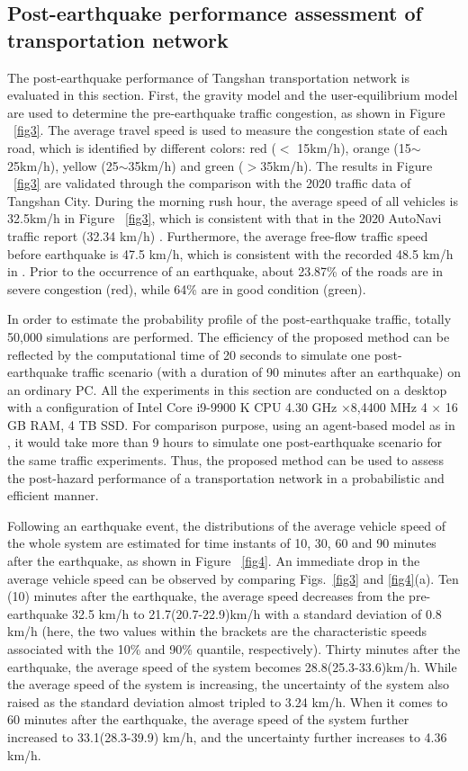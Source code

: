 \documentclass[review,11pt,nonatbib]{elsarticle}
\begin{document}
\subsection{Post-earthquake performance assessment of transportation network}
The post-earthquake performance of Tangshan transportation network is evaluated in this section. First, the gravity model and the user-equilibrium model are used to determine the pre-earthquake traffic congestion, as shown in Figure ~\ref{fig3}. The average travel speed is used to measure the congestion state of each road, which is identified by different colors: red ($<$ 15km/h), orange (15$\sim$25km/h), yellow (25$\sim$35km/h) and green ($>$35km/h). The results in Figure ~\ref{fig3} are validated through the comparison with the 2020 traffic data of Tangshan City. During the morning rush hour, the average speed of all vehicles is 32.5km/h in Figure ~\ref{fig3}, which is consistent with that in the 2020 AutoNavi traffic report (32.34 km/h) \citep{autonavi2020}. Furthermore, the average free-flow traffic speed before earthquake is 47.5 km/h, which is consistent with the recorded 48.5 km/h in \citep{autonavi2020}. Prior to the occurrence of an earthquake, about 23.87\% of the roads are in severe congestion (red), while 64\% are in good condition (green).

\par  In order to estimate the probability profile of the post-earthquake traffic, totally 50,000 simulations are performed. The efficiency of the proposed method can be reflected by the computational time of 20 seconds to simulate one post-earthquake traffic scenario (with a duration of 90 minutes after an earthquake) on an ordinary PC. All the experiments in this section are conducted on a desktop with a configuration of Intel Core i9-9900 K CPU 4.30 GHz ×8,4400 MHz 4 $\times$ 16 GB RAM, 4 TB SSD. For comparison purpose, using an agent-based model as in  \citep{feng2017post}, it would take more than 9 hours to simulate one post-earthquake scenario for the same traffic experiments. Thus, the proposed method can be used to assess the post-hazard performance of a transportation network in a probabilistic and efficient manner. 

\par Following an earthquake event, the distributions of the average vehicle speed of the whole system are estimated for time instants of 10, 30, 60 and 90 minutes after the earthquake, as shown in Figure ~\ref{fig4}. An immediate drop in the average vehicle speed can be observed by comparing Figs.~\ref{fig3} and \ref{fig4}(a). Ten (10) minutes after the earthquake, the average speed decreases from the pre-earthquake 32.5 km/h to 21.7(20.7-22.9)km/h with a standard deviation of 0.8 km/h (here, the two values within the brackets are the characteristic speeds associated with the 10\% and 90\% quantile, respectively). Thirty minutes after the earthquake, the average speed of the system becomes 28.8(25.3-33.6)km/h. While the average speed of the system is increasing, the uncertainty of the system also raised as the standard deviation almost tripled to 3.24 km/h. When it comes to 60 minutes after the earthquake, the average speed of the system further increased to 33.1(28.3-39.9) km/h, and the uncertainty further increases to 4.36 km/h. 
\end{document}
